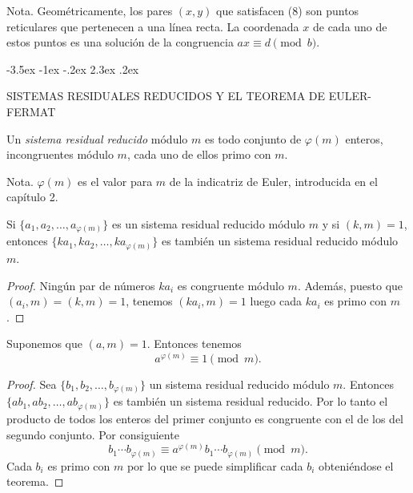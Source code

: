 \documentclass[12pt,a4paper]{book}
\makeatletter
\renewcommand\section{\@startsection{section}{1}{\z@}%
  {-3.5ex \@plus -1ex \@minus -.2ex}%
  {2.3ex \@plus .2ex}%
  {\normalfont\Large\bfseries\raggedright}}
\makeatother
\begin{document}
    Nota. Geométricamente, los pares $(x,y)$ que satisfacen (8) son puntos reticulares
    que pertenecen a una línea recta. La coordenada $x$ de cada uno de estos puntos es
    una solución de la congruencia $ax\equiv d\pmod{b}$.

    \section{SISTEMAS RESIDUALES REDUCIDOS Y EL TEOREMA DE EULER-FERMAT}
    \begin{definicion}
        Un \textit{sistema residual reducido} módulo $m$ es todo conjunto de $\varphi(m)$
        enteros, incongruentes módulo $m$, cada uno de ellos primo con $m$.
    \end{definicion}

    Nota. $\varphi(m)$ es el valor para $m$ de la indicatriz de Euler, introducida en el
    capítulo 2.

    \begin{teorema}
        Si $\{a_{1},a_{2},\dots,a_{\varphi(m)}\}$ es un sistema residual reducido módulo $m$ y
        si $(k,m)=1$, entonces $\{ka_{1},ka_{2},\dots,ka_{\varphi(m)}\}$ es también un
        sistema residual reducido módulo $m$.
    \end{teorema}

    \begin{proof}
        Ningún par de números $ka_{i}$ es congruente módulo $m$. Además, puesto que
        $(a_{i},m)=(k,m)=1$, tenemos $(ka_{i},m)=1$ luego cada $ka_{i}$ es primo con $m$.
    \end{proof}

    \begin{teorema}
        Suponemos que $(a,m)=1$. Entonces tenemos
        \begin{equation*}
            a^{\varphi(m)}\equiv1\pmod{m}.
        \end{equation*}
    \end{teorema}

    \begin{proof}
        Sea $\{b_{1},b_{2},\dots,b_{\varphi(m)}\}$ un sistema residual reducido módulo $m$.
        Entonces $\{ab_{1},ab_{2},\dots,ab_{\varphi(m)}\}$ es también un sistema residual
        reducido. Por lo tanto el producto de todos los enteros del primer conjunto es
        congruente con el de los del segundo conjunto. Por consiguiente
        \begin{equation*}
            b_{1}\cdots b_{\varphi(m)}\equiv a^{\varphi(m)}b_{1}\cdots b_{\varphi(m)}\pmod{m}.
        \end{equation*}
        Cada $b_{i}$ es primo con $m$ por lo que se puede simplificar cada $b_{i}$
        obteniéndose el teorema.
    \end{proof}
\end{document}
